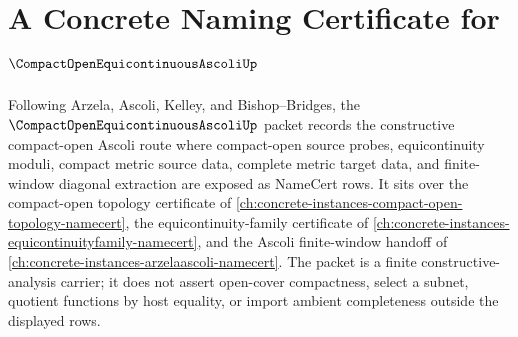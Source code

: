 \chapter{A Concrete Naming Certificate for $\CompactOpenEquicontinuousAscoliUp$}
\label{ch:concrete-instances-compact-open-equicontinuous-ascoli-namecert}

Following Arzela, Ascoli, Kelley, and Bishop--Bridges, the $\CompactOpenEquicontinuousAscoliUp$ packet records the constructive compact-open Ascoli route where compact-open source probes, equicontinuity moduli, compact metric source data, complete metric target data, and finite-window diagonal extraction are exposed as NameCert rows. It sits over the compact-open topology certificate of \autoref{ch:concrete-instances-compact-open-topology-namecert}, the equicontinuity-family certificate of \autoref{ch:concrete-instances-equicontinuityfamily-namecert}, and the Ascoli finite-window handoff of \autoref{ch:concrete-instances-arzelaascoli-namecert}. The packet is a finite constructive-analysis carrier; it does not assert open-cover compactness, select a subnet, quotient functions by host equality, or import ambient completeness outside the displayed rows.

